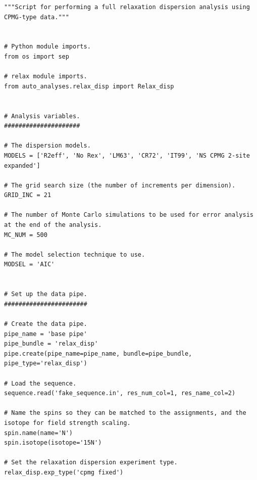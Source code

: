 \begin{lstlisting}
"""Script for performing a full relaxation dispersion analysis using CPMG-type data."""


# Python module imports.
from os import sep

# relax module imports.
from auto_analyses.relax_disp import Relax_disp


# Analysis variables.
#####################

# The dispersion models.
MODELS = ['R2eff', 'No Rex', 'LM63', 'CR72', 'IT99', 'NS CPMG 2-site expanded']

# The grid search size (the number of increments per dimension).
GRID_INC = 21

# The number of Monte Carlo simulations to be used for error analysis at the end of the analysis.
MC_NUM = 500

# The model selection technique to use.
MODSEL = 'AIC'


# Set up the data pipe.
#######################

# Create the data pipe.
pipe_name = 'base pipe'
pipe_bundle = 'relax_disp'
pipe.create(pipe_name=pipe_name, bundle=pipe_bundle, pipe_type='relax_disp')

# Load the sequence.
sequence.read('fake_sequence.in', res_num_col=1, res_name_col=2)

# Name the spins so they can be matched to the assignments, and the isotope for field strength scaling.
spin.name(name='N')
spin.isotope(isotope='15N')

# Set the relaxation dispersion experiment type.
relax_disp.exp_type('cpmg fixed')


\end{lstlisting}
